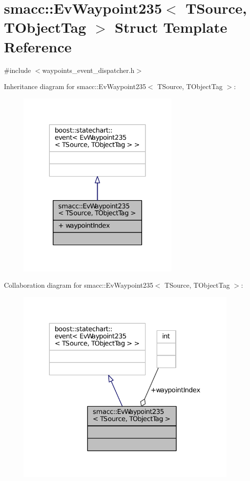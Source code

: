 \hypertarget{structsmacc_1_1EvWaypoint235}{}\section{smacc\+:\+:Ev\+Waypoint235$<$ T\+Source, T\+Object\+Tag $>$ Struct Template Reference}
\label{structsmacc_1_1EvWaypoint235}


{\ttfamily \#include $<$waypoints\+\_\+event\+\_\+dispatcher.\+h$>$}



Inheritance diagram for smacc\+:\+:Ev\+Waypoint235$<$ T\+Source, T\+Object\+Tag $>$\+:
\nopagebreak
\begin{figure}[H]
\begin{center}
\leavevmode
\includegraphics[width=227pt]{structsmacc_1_1EvWaypoint235__inherit__graph}
\end{center}
\end{figure}


Collaboration diagram for smacc\+:\+:Ev\+Waypoint235$<$ T\+Source, T\+Object\+Tag $>$\+:
\nopagebreak
\begin{figure}[H]
\begin{center}
\leavevmode
\includegraphics[width=312pt]{structsmacc_1_1EvWaypoint235__coll__graph}
\end{center}
\end{figure}
